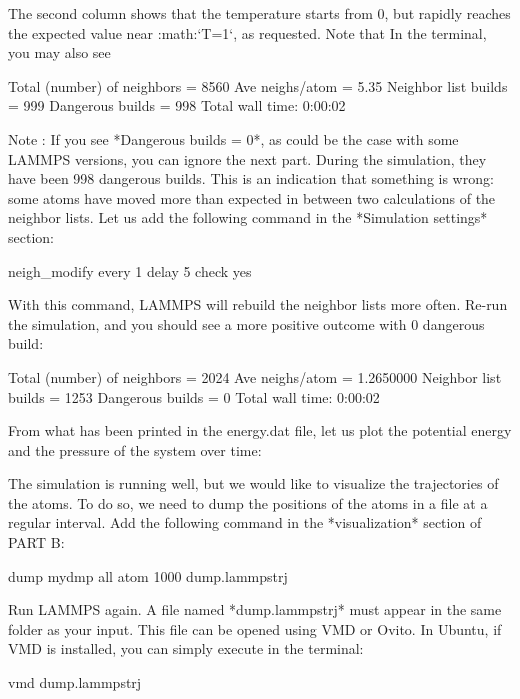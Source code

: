 The second column shows that the temperature
starts from 0, but rapidly reaches the
expected value near :math:`T=1`, as requested. 
Note that  In the terminal, you may also see

\begin{lcverbatim}
Total (number) of neighbors = 8560
Ave neighs/atom = 5.35
Neighbor list builds = 999
Dangerous builds = 998
Total wall time: 0:00:02
\end{lcverbatim}

Note : If you see *Dangerous builds = 0*, as could be
the case with some LAMMPS versions, you can ignore
the next part.
During the simulation, they have been 998 dangerous builds.
This is an indication that something is wrong: some atoms
have moved more than expected in between two calculations of
the neighbor lists. Let us add the following command in the
*Simulation settings* section:

\begin{lcverbatim}
neigh_modify every 1 delay 5 check yes
\end{lcverbatim}

With this command, LAMMPS will rebuild the neighbor lists
more often. Re-run the simulation, and you should see a more
positive outcome with 0 dangerous build:

\begin{lcverbatim}
Total (number) of neighbors = 2024
Ave neighs/atom = 1.2650000
Neighbor list builds = 1253
Dangerous builds = 0
Total wall time: 0:00:02
\end{lcverbatim}

From what has been printed in the energy.dat file, let us
plot the potential energy and the pressure of
the system over time:

The simulation is running well, but we would like to
visualize the trajectories of the atoms. To do so, we need
to dump the positions of the atoms in a file at a regular
interval. Add the following command in the *visualization*
section of PART B:

\begin{lcverbatim}
dump mydmp all atom 1000 dump.lammpstrj
\end{lcverbatim}

Run LAMMPS again. A file named *dump.lammpstrj* must appear in
the same folder as your input. This file can be opened using
VMD or Ovito. In Ubuntu, if VMD is installed, you can simply
execute in the terminal:

\begin{lcverbatim}
vmd dump.lammpstrj
\end{lcverbatim}


